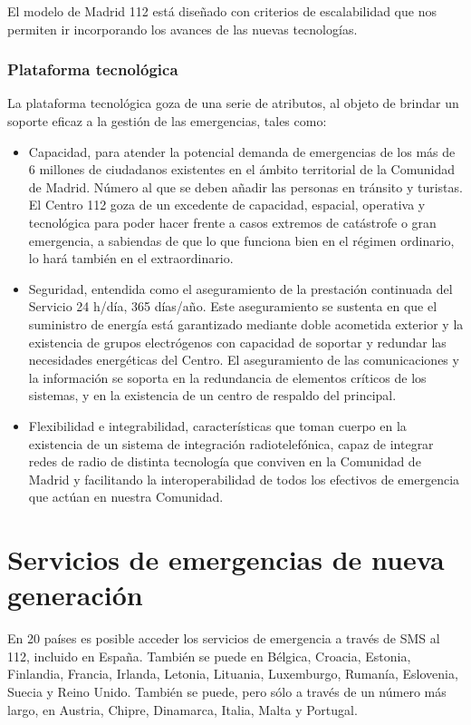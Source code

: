 El modelo de Madrid 112 está diseñado con criterios de escalabilidad que nos permiten ir incorporando los avances de las nuevas tecnologías.

\subsubsection{Plataforma tecnológica}

La plataforma tecnológica goza de una serie de atributos, al objeto de brindar un soporte eficaz a la gestión de las emergencias, tales como:

\begin{itemize}
  \item Capacidad, para atender la potencial demanda de emergencias de los más de 6 millones de ciudadanos existentes en el ámbito territorial de la Comunidad de Madrid. Número al que se deben añadir las personas en tránsito y turistas. El Centro 112 goza de un excedente de capacidad, espacial, operativa y tecnológica para poder hacer frente a casos extremos de catástrofe o gran emergencia, a sabiendas de que lo que funciona bien en el régimen ordinario, lo hará también en el extraordinario.
  \item Seguridad, entendida como el aseguramiento de la prestación continuada del Servicio 24 h/día, 365 días/año. Este aseguramiento se sustenta en que el suministro de energía está garantizado mediante doble acometida exterior y la existencia de grupos electrógenos con capacidad de soportar y redundar las necesidades energéticas del Centro. El aseguramiento de las comunicaciones y la información se soporta en la redundancia de elementos críticos de los sistemas, y en la existencia de un centro de respaldo del principal.
  \item Flexibilidad e integrabilidad, características que toman cuerpo en la existencia de un sistema de integración radiotelefónica, capaz de integrar redes de radio de distinta tecnología que conviven en la Comunidad de Madrid y facilitando la interoperabilidad de todos los efectivos de emergencia que actúan en nuestra Comunidad.
\end{itemize}

\section{Servicios de emergencias de nueva generación}

En 20 países es posible acceder los servicios de emergencia a través de SMS al 112, incluido en España. También se puede en Bélgica, Croacia, Estonia, Finlandia, Francia, Irlanda, Letonia, Lituania, Luxemburgo, Rumanía, Eslovenia, Suecia y Reino Unido. También se puede, pero sólo a través de un número más largo, en Austria, Chipre, Dinamarca, Italia, Malta y Portugal.

